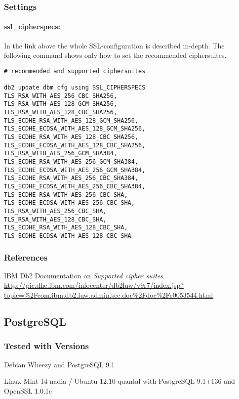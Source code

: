 \subsubsection{Settings}
\paragraph{ssl\_cipherspecs:}
In the link above the whole SSL-configuration is described in-depth. The following command shows only how to set the recommended ciphersuites.
\begin{lstlisting}
# recommended and supported ciphersuites 

db2 update dbm cfg using SSL_CIPHERSPECS 
TLS_RSA_WITH_AES_256_CBC_SHA256,
TLS_RSA_WITH_AES_128_GCM_SHA256,
TLS_RSA_WITH_AES_128_CBC_SHA256,
TLS_ECDHE_RSA_WITH_AES_128_GCM_SHA256,
TLS_ECDHE_ECDSA_WITH_AES_128_GCM_SHA256,
TLS_ECDHE_RSA_WITH_AES_128_CBC_SHA256,
TLS_ECDHE_ECDSA_WITH_AES_128_CBC_SHA256,
TLS_RSA_WITH_AES_256_GCM_SHA384,
TLS_ECDHE_RSA_WITH_AES_256_GCM_SHA384,
TLS_ECDHE_ECDSA_WITH_AES_256_GCM_SHA384,
TLS_ECDHE_RSA_WITH_AES_256_CBC_SHA384,
TLS_ECDHE_ECDSA_WITH_AES_256_CBC_SHA384,
TLS_ECDHE_RSA_WITH_AES_256_CBC_SHA,
TLS_ECDHE_ECDSA_WITH_AES_256_CBC_SHA,
TLS_RSA_WITH_AES_256_CBC_SHA,
TLS_RSA_WITH_AES_128_CBC_SHA,
TLS_ECDHE_RSA_WITH_AES_128_CBC_SHA,
TLS_ECDHE_ECDSA_WITH_AES_128_CBC_SHA
\end{lstlisting}


\subsubsection{References}
\begin{itemize*}
  \item IBM Db2 Documentation on \emph{Supported cipher suites}.\\\url{http://pic.dhe.ibm.com/infocenter/db2luw/v9r7/index.jsp?topic=\%2Fcom.ibm.db2.luw.admin.sec.doc\%2Fdoc\%2Fc0053544.html}
\end{itemize*}


\subsection{PostgreSQL}
\subsubsection{Tested with Versions}
\begin{itemize*}
  \item Debian Wheezy and PostgreSQL 9.1
  \item Linux Mint 14 nadia / Ubuntu 12.10 quantal with PostgreSQL 9.1+136 and OpenSSL 1.0.1c
\end{itemize*}


